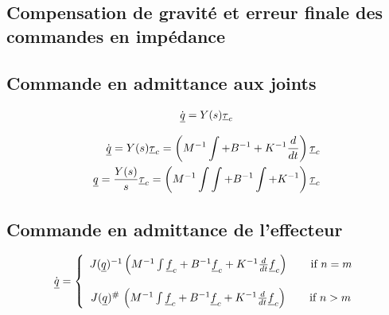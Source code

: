 \subsection{Compensation de gravité et erreur finale des commandes en impédance}
\label{sec:impcontrolconvergence}



\subsection{Commande en admittance aux joints}
\label{sec:jointadmcontrol}

\begin{align}
\dot{\underline{q}} = Y(s) \underline{\tau}_{c}
\end{align}

\begin{align}
\dot{\underline{q}} = Y(s) \underline{\tau}_{c} = \left( M^{-1} \int + B^{-1}  + K^{-1} \frac{d}{dt}  \right) \underline{\tau}_{c} \\
\underline{q} = \frac{Y(s)}{s}  \underline{\tau}_{c} = \left( M^{-1} \int \int + B^{-1} \int  + K^{-1}  \right) \underline{\tau}_{c}
\end{align}

\subsection{Commande en admittance de l'effecteur}
\label{sec:effadmcontrol}

\begin{align}
\dot{\underline{q}} = \left\{ \begin{array}{c}
 J(\underline{q})^{-1} \left( M^{-1} \int \underline{f}_{c} + B^{-1} \underline{f}_{c} + K^{-1} \frac{d}{dt} \underline{f}_{c} \right)   \quad\quad \text{if $n=m$}
 \\ \\
 J(\underline{q})^{\#} \, \left( M^{-1} \int \underline{f}_{c} + B^{-1} \underline{f}_{c} + K^{-1} \frac{d}{dt} \underline{f}_{c} \right)  \quad\quad \text{if $n>m$}
\end{array}
\right.
\end{align}

